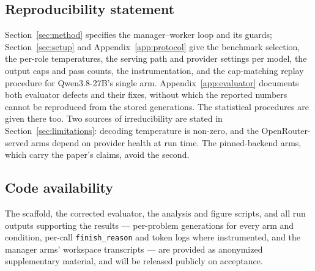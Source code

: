 \documentclass{article}
\newif\iffinalversion
\begin{document}
\subsection*{Reproducibility statement}

Section~\ref{sec:method} specifies the manager--worker loop and its guards;
Section~\ref{sec:setup} and Appendix~\ref{app:protocol} give
the benchmark selection, the per-role temperatures, the serving path and provider settings per model, the output caps and
pass counts, the instrumentation, and the cap-matching replay procedure for Qwen3.8-27B's single
arm. Appendix~\ref{app:evaluator} documents both evaluator defects and their fixes, without which the
reported numbers cannot be reproduced from the stored generations. The statistical procedures are
given there too. Two sources of irreducibility are stated in
Section~\ref{sec:limitations}: decoding temperature is non-zero, and the OpenRouter-served arms
depend on provider health at run time. The pinned-backend arms, which carry the paper's claims,
avoid the second.

\subsection*{Code availability}

\iffinalversion
The orchestration scaffold (both versions), the corrected LiveCodeBench evaluator, and the
analysis and figure scripts that produce every number and figure in this paper are available at
\url{https://github.com/slee-persis/GVS5H}, together with all run outputs supporting the results
--- per-problem generations for every arm and condition, per-call \texttt{finish\_reason} and
token logs where instrumented, and the manager arms' workspace transcripts (\texttt{runs/}).
\else
The scaffold, the corrected evaluator, the analysis and figure scripts, and all run outputs
supporting the results --- per-problem generations for every arm and condition, per-call
\texttt{finish\_reason} and token logs where instrumented, and the manager arms' workspace
transcripts --- are provided as anonymized supplementary material, and will be released publicly
on acceptance.
\fi

\iffinalversion

\fi

\iffinalversion
%
%
%
\fi
\end{document}
